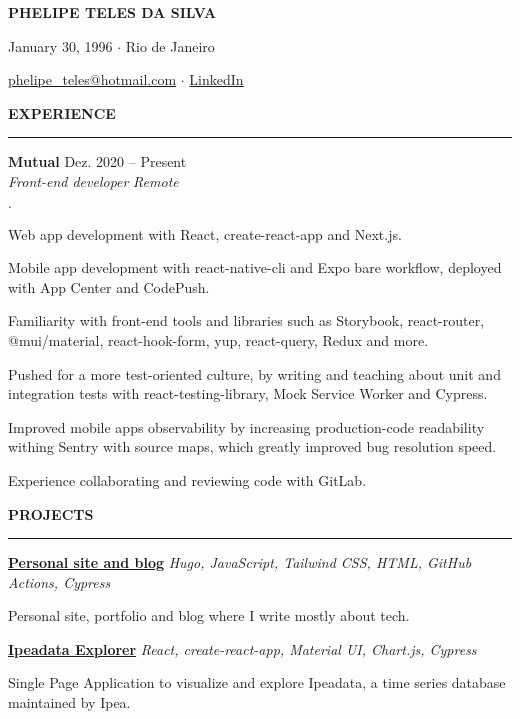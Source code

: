 \documentclass[11pt,letterpaper]{article}
\newenvironment{tightlist}
  {\begin{list}
    {$\cdot$}
    {
      \setlength{\leftmargin}{0em}
      \setlength{\itemsep}{-\smallskipamount}
    }
  }
{\end{list}}
\begin{document}
\pagestyle{empty}

\centerline{\huge\bf PHELIPE TELES DA SILVA}
\medskip

\centerline{January 30, 1996 $\cdot$ Rio de Janeiro}
\smallskip

\centerline{
  \href{mailto:phelipe_teles@hotmail.com}{phelipe\_teles@hotmail.com}
  $\cdot$
  \href{https://linkedin.com/in/phelipeteles}{LinkedIn}
}
\smallskip

\medskip \textbf{EXPERIENCE} \medskip
\hrule

\textbf{Mutual} \hfill Dez. 2020 -- Present \\
\emph{Front-end developer} \hfill \emph{Remote} {\parfillskip=0pt\par}

\begin{tightlist}
  \item Web app development with React, create-react-app and Next.js.
  \item Mobile app development with react-native-cli and Expo bare workflow,
    deployed with App Center and CodePush.
  \item Familiarity with front-end tools and libraries such as Storybook,
    react-router, @mui/material, react-hook-form, yup, react-query, Redux and
    more.
  \item Pushed for a more test-oriented culture, by writing and teaching about
    unit and integration tests with react-testing-library, Mock Service Worker
    and Cypress.
  \item Improved mobile apps observability by increasing production-code
    readability withing Sentry with source maps, which greatly improved bug
    resolution speed.
  \item Experience collaborating and reviewing code with GitLab.
\end{tightlist}

\medskip \textbf{PROJECTS} \medskip
\hrule

\textbf{\href{https://phelipetls.github.io}{Personal site and blog}} \hfill \emph{Hugo, JavaScript, Tailwind CSS, HTML, GitHub Actions, Cypress}
{\parfillskip=0pt\par}
Personal site, portfolio and blog where I write mostly about tech.

\smallskip

\textbf{\href{http://ipeadata-explorer.surge.sh}{Ipeadata Explorer}} \hfill \emph{React, create-react-app, Material UI, Chart.js, Cypress}
{\parfillskip=0pt\par}
Single Page Application to visualize and explore Ipeadata, a time series database maintained by Ipea.
\end{document}
